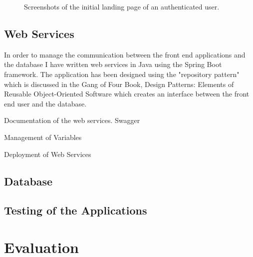 \documentclass[a4paper,11pt]{report}
\begin{document}
\begin{figure}[H]
    \centering
    \caption{Screenshots of the initial landing page of an authenticated user.}
    \label{fig:WebUi}
\end{figure}

\section{Web Services}
In order to manage the communication between the front end applications and the database I have written web services in Java using the Spring Boot framework. 
The application has been designed using the "repository pattern" which is discussed in the Gang of Four Book, Design Patterns: Elements of Reusable Object-Oriented Software\cite{gamma1994design} which creates an interface between the front end user and the database.

Documentation of the web services.
Swagger

Management of Variables

Deployment of Web Services



\section{Database}

\section{Testing of the Applications}

\chapter{Evaluation}
\end{document}
